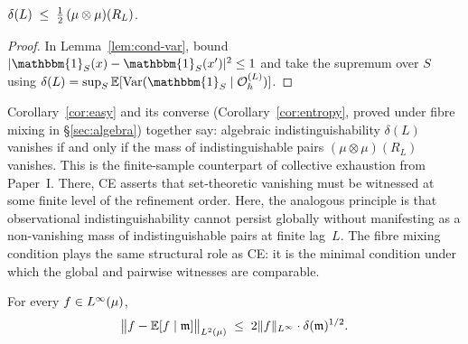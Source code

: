 \begin{corollary}
\label{cor:easy}
$\delta(L) \;\leq\; \tfrac{1}{2}\,(\mu \otimes \mu)(R_L)$.
\end{corollary}

\begin{proof}
In Lemma~\ref{lem:cond-var}, bound $|\mathbbm{1}_S(x) - \mathbbm{1}_S(x')|^2 \leq 1$
and take the supremum over $S$ using
$\deltaL = \sup_S \mathbb{E}[\mathrm{Var}(\mathbbm{1}_S \mid \OhL)]$.
\end{proof}

\begin{remark}
Corollary~\ref{cor:easy} and its converse (Corollary~\ref{cor:entropy}, proved
under fibre mixing in \S\ref{sec:algebra}) together say: algebraic
indistinguishability $\delta(L)$ vanishes if and only if the mass of
indistinguishable pairs $(\mu\otimes\mu)(R_L)$ vanishes.  This is the
finite-sample counterpart of collective exhaustion from Paper~I.  There, CE
asserts that set-theoretic vanishing must be witnessed at some finite level of
the refinement order.  Here, the analogous principle is that observational
indistinguishability cannot persist globally without manifesting as a
non-vanishing mass of indistinguishable pairs at finite lag~$L$.  The fibre
mixing condition plays the same structural role as CE: it is the minimal
condition under which the global and pairwise witnesses are comparable.
\end{remark}

\begin{lemma}
\label{lem:bias}
For every $f \in L^{\infty}(\mu)$,
\[
  \bigl\| f - \mathbb{E}[f \mid \mathfrak{m}] \bigr\|_{L^{2}(\mu)}
  \;\leq\;
  2\|f\|_{L^{\infty}} \cdot \delta(\mathfrak{m})^{1/2}.
\]
\end{lemma}

